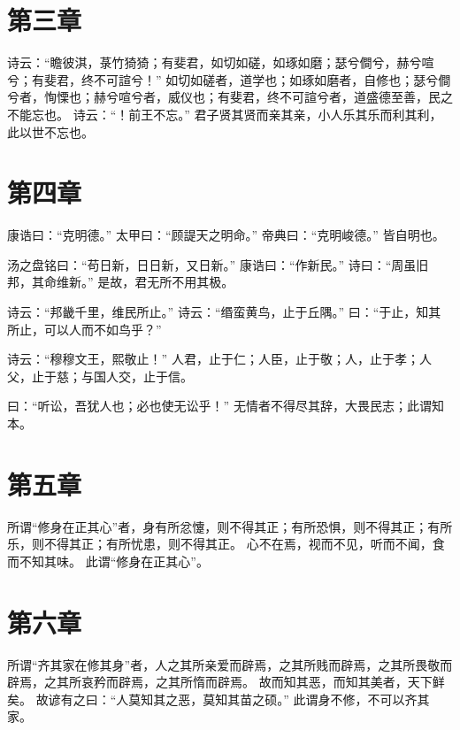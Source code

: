 \documentclass[twoside,openany]{book}
\begin{document}
\begin{pinyinscope}
\chapter{第三章}\label{ch03}
诗云：“瞻彼淇，菉竹猗猗；有斐君，如切如磋，如琢如磨；瑟兮僴兮，赫兮喧兮；有斐君，终不可諠兮！”
如切如磋者，道学也；如琢如磨者，自修也；瑟兮僴兮者，恂慄也；赫兮喧兮者，威仪也；有斐君，终不可諠兮者，道盛德至善，民之不能忘也。
诗云：“！前王不忘。”
君子贤其贤而亲其亲，小人乐其乐而利其利，此以世不忘也。

\chapter{第四章}\label{ch04}
康诰曰：“克明德。”
太甲曰：“顾諟天之明命。”
帝典曰：“克明峻德。”
皆自明也。

汤之盘铭曰：“苟日新，日日新，又日新。”
康诰曰：“作新民。”
诗曰：“周虽旧邦，其命维新。”
是故，君无所不用其极。

诗云：“邦畿千里，维民所止。”
诗云：“缗蛮黄鸟，止于丘隅。”
曰：“于止，知其所止，可以人而不如鸟乎？”

诗云：“穆穆文王，熙敬止！”
人君，止于仁；人臣，止于敬；人，止于孝；人父，止于慈；与国人交，止于信。

曰：“听讼，吾犹人也；必也使无讼乎！”
无情者不得尽其辞，大畏民志；此谓知本。

\chapter{第五章}\label{ch05}
所谓“修身在正其心”者，身有所忿懥，则不得其正；有所恐惧，则不得其正；有所乐，则不得其正；有所忧患，则不得其正。
心不在焉，视而不见，听而不闻，食而不知其味。
此谓“修身在正其心”。

\chapter{第六章}\label{ch06}
所谓“齐其家在修其身”者，人之其所亲爱而辟焉，之其所贱而辟焉，之其所畏敬而辟焉，之其所哀矜而辟焉，之其所惰而辟焉。
故而知其恶，而知其美者，天下鲜矣。
故谚有之曰：“人莫知其之恶，莫知其苗之硕。”
此谓身不修，不可以齐其家。


\end{pinyinscope}
\end{document}
